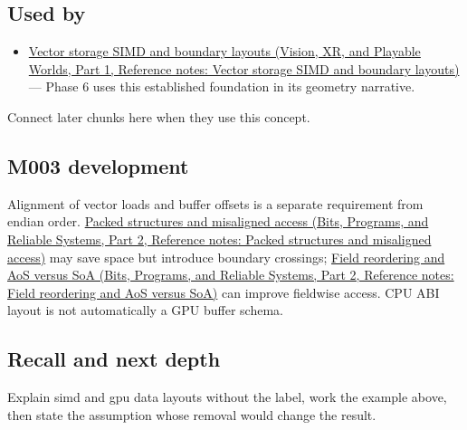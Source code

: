 \subsection{Used by}\label{appendix-3c7b1a56de01-used-by}

\hypertarget{appendix-3c7b1a56de01-used-by}{}

\begin{itemize}
\tightlist
\item
  \href{../07-Vision-XR-and-Playable-Worlds-P01/main.pdf\#nameddest=appendix-26bf6bf2fb8b}{Vector storage SIMD and boundary layouts (Vision, XR, and Playable Worlds, Part 1, Reference notes: Vector storage SIMD and boundary layouts)} --- Phase 6 uses this established foundation in its geometry narrative.
\end{itemize}

Connect later chunks here when they use this concept.

\subsection{M003 development}\label{appendix-3c7b1a56de01-m003-development}

\hypertarget{appendix-3c7b1a56de01-m003-development}{}

Alignment of vector loads and buffer offsets is a separate requirement from endian order. \href{../01-Bits-Programs-and-Reliable-Systems-P02/main.pdf\#nameddest=appendix-0682dbfc5f0e}{Packed structures and misaligned access (Bits, Programs, and Reliable Systems, Part 2, Reference notes: Packed structures and misaligned access)} may save space but introduce boundary crossings; \href{../01-Bits-Programs-and-Reliable-Systems-P02/main.pdf\#nameddest=appendix-5522ad176ca0}{Field reordering and AoS versus SoA (Bits, Programs, and Reliable Systems, Part 2, Reference notes: Field reordering and AoS versus SoA)} can improve fieldwise access. CPU ABI layout is not automatically a GPU buffer schema.

\subsection{Recall and next depth}\label{appendix-3c7b1a56de01-recall-and-next-depth}

\hypertarget{appendix-3c7b1a56de01-recall-and-next-depth}{}

Explain simd and gpu data layouts without the label, work the example above, then state the assumption whose removal would change the result.

